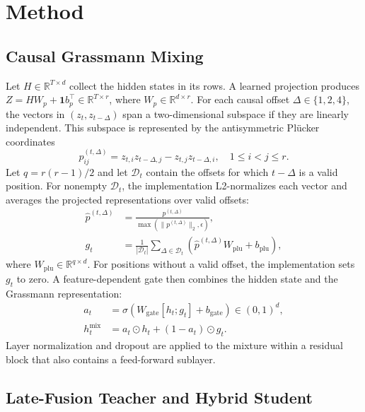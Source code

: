 \documentclass[conference]{IEEEtran}
\begin{document}
\section{Method}

\subsection{Causal Grassmann Mixing}

Let $H\in\mathbb{R}^{T\times d}$ collect the hidden states in its rows.  A
learned projection produces $Z=HW_p+\mathbf{1}b_p^\top\in
\mathbb{R}^{T\times r}$, where $W_p\in\mathbb{R}^{d\times r}$.  For each
causal offset $\Delta\in\{1,2,4\}$, the vectors in
$(z_t,z_{t-\Delta})$ span a two-dimensional subspace if they are linearly
independent.  This subspace is represented by the antisymmetric Pl\"ucker
coordinates
\begin{equation}
p_{ij}^{(t,\Delta)} = z_{t,i}z_{t-\Delta,j}
                    - z_{t,j}z_{t-\Delta,i},\quad 1\leq i<j\leq r.
\label{eq:plucker}
\end{equation}
Let $q=r(r-1)/2$ and let $\mathcal{D}_t$ contain the offsets for which
$t-\Delta$ is a valid position.  For nonempty $\mathcal{D}_t$, the implementation
L2-normalizes each vector and averages the projected representations over
valid offsets:
\begin{align}
\widehat{p}^{(t,\Delta)}
&=\frac{p^{(t,\Delta)}}
{\max(\lVert p^{(t,\Delta)}\rVert_2,\epsilon)}, \\
g_t
&=\frac{1}{|\mathcal{D}_t|}\sum_{\Delta\in\mathcal{D}_t}
\left(\widehat{p}^{(t,\Delta)}W_{\mathrm{plu}}+b_{\mathrm{plu}}\right),
\label{eq:grassmann_projection}
\end{align}
where $W_{\mathrm{plu}}\in\mathbb{R}^{q\times d}$.  For positions without a
valid offset, the implementation sets $g_t$ to zero.  A feature-dependent gate
then combines the hidden state and the Grassmann representation:
\begin{align}
a_t &= \sigma\!\left(W_{\mathrm{gate}}[h_t;g_t]+b_{\mathrm{gate}}\right)
      \in(0,1)^d, \\
h_t^{\mathrm{mix}} &= a_t\odot h_t+(1-a_t)\odot g_t.
\label{eq:grassmann_gate}
\end{align}
Layer normalization and dropout are applied to the mixture within a residual
block that also contains a feed-forward sublayer.

\subsection{Late-Fusion Teacher and Hybrid Student}
\end{document}
